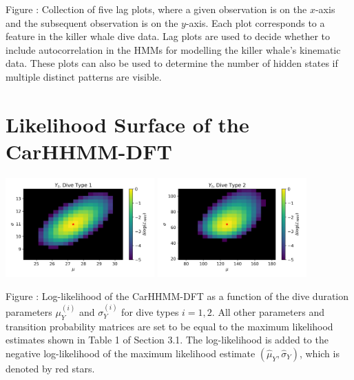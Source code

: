 \documentclass{article}
\begin{document}
        \noindent Figure : Collection of five lag plots, where a given observation is on the $x$-axis and the subsequent observation is on the $y$-axis. Each plot corresponds to a feature in the killer whale dive data. Lag plots are used to decide whether to include autocorrelation in the HMMs for modelling the killer whale's kinematic data. These plots can also be used to determine the number of hidden states if multiple distinct patterns are visible. 
        \addtocounter{fignum}{1}
        
        \newpage
        
    \section{Likelihood Surface of the CarHHMM-DFT}
    
        \begin{center}
        \includegraphics[width=2.25in]{../Plots/2019/20190902-182840-CATs_OB_1_0_267_CarHHMM2_coarse-theta-likelihood-dive_duration-1.png}
        \includegraphics[width=2.25in]{../Plots/2019/20190902-182840-CATs_OB_1_0_267_CarHHMM2_coarse-theta-likelihood-dive_duration-2.png}
        \end{center}
        
        \noindent Figure : Log-likelihood of the CarHHMM-DFT as a function of the dive duration parameters $\mu_Y^{(i)}$ and $\sigma_Y^{(i)}$ for dive types $i = 1,2$. All other parameters and transition probability matrices are set to be equal to the maximum likelihood estimates shown in Table 1 of Section 3.1. The log-likelihood is added to the negative log-likelihood of the maximum likelihood estimate $(\hat \mu_Y,\hat \sigma_Y)$, which is denoted by red stars.
        \addtocounter{fignum}{1}
        
\end{document}
